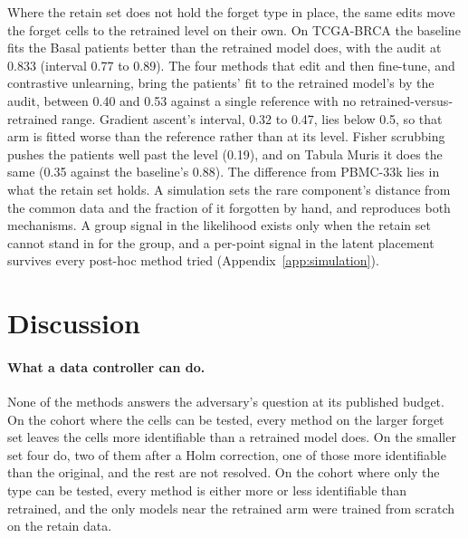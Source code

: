 \documentclass{article}
\begin{document}
Where the retain set does not hold the forget type in place, the same edits move the forget cells to the retrained level on their own. On TCGA-BRCA the baseline fits the Basal patients better than the retrained model does, with the audit at 0.833 (interval 0.77 to 0.89). The four methods that edit and then fine-tune, and contrastive unlearning, bring the patients' fit to the retrained model's by the audit, between 0.40 and 0.53 against a single reference with no retrained-versus-retrained range. Gradient ascent's interval, 0.32 to 0.47, lies below 0.5, so that arm is fitted worse than the reference rather than at its level. Fisher scrubbing pushes the patients well past the level (0.19), and on Tabula Muris it does the same (0.35 against the baseline's 0.88). The difference from PBMC-33k lies in what the retain set holds. A simulation sets the rare component's distance from the common data and the fraction of it forgotten by hand, and reproduces both mechanisms. A group signal in the likelihood exists only when the retain set cannot stand in for the group, and a per-point signal in the latent placement survives every post-hoc method tried (Appendix~\ref{app:simulation}).

\section{Discussion}
\label{sec:discussion}

\paragraph{What a data controller can do.} None of the methods answers the adversary's question at its published budget. On the cohort where the cells can be tested, every method on the larger forget set leaves the cells more identifiable than a retrained model does. On the smaller set four do, two of them after a Holm correction, one of those more identifiable than the original, and the rest are not resolved. On the cohort where only the type can be tested, every method is either more or less identifiable than retrained, and the only models near the retrained arm were trained from scratch on the retain data.
\end{document}
